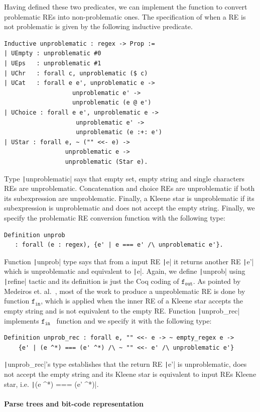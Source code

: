 \documentclass[oneside,12pt]{scrbook}
\theoremstyle{definition}
\newcommand{\fin}{\ensuremath{\texttt{f$_{\texttt{in}}$}}}
\newcommand{\fout}{\ensuremath{\texttt{f$_{\texttt{out}}$}}}
\newcommand{\coq}[1]{\texttt|#1|}
\theoremstyle{plain}
\theoremstyle{definition}
\begin{document}
Having defined these two predicates, we can implement the function to
convert problematic REs into non-problematic ones. The specification
of when a RE is not problematic is given by the following inductive predicate. 
\begin{verbatim}
Inductive unproblematic : regex -> Prop :=
| UEmpty : unproblematic #0
| UEps   : unproblematic #1
| UChr   : forall c, unproblematic ($ c)
| UCat   : forall e e', unproblematic e ->
                   unproblematic e' ->
                   unproblematic (e @ e')
| UChoice : forall e e', unproblematic e ->
                    unproblematic e' ->
                    unproblematic (e :+: e')
| UStar : forall e, ~ ("" <<- e) -> 
                 unproblematic e -> 
                 unproblematic (Star e).
\end{verbatim}
Type \coq{unproblematic} says that empty set, empty string and single
characters REs are unproblematic. Concatenation and choice REs are
unproblematic if both its subexpression are unproblematic. Finally,
a Kleene star is unproblematic if its subexpression is unproblematic and
does not accept the empty string. Finally, we specify the problematic RE
conversion function with the following type:
\begin{verbatim}
Definition unprob 
   : forall (e : regex), {e' | e === e' /\ unproblematic e'}.
\end{verbatim}
Function \coq{unprob} type says that from a input RE \coq{e} it returns another
RE \coq{e'} which is unproblematic and equivalent to \coq{e}. Again, we define
\coq{unprob} using \coq{refine} tactic and its definition is just the
Coq coding of \fout. As pointed by Medeiros et. al.~\cite{Medeiros14}, most of
the work to produce a unproblematic RE is done by function \fin, which is
applied when the inner RE of a Kleene star accepts the empty string and is not
equivalent to the empty RE. Function \coq{unprob_rec} implements \fin~ function
and we specify it with the following type:
\begin{verbatim}
Definition unprob_rec : forall e, "" <<- e -> ~ empty_regex e -> 
    {e' | (e ^*) === (e' ^*) /\ ~ "" <<- e' /\ unproblematic e'}
\end{verbatim}
\coq{unprob_rec}'s type establishes that the return RE \coq{e'} is unproblematic, does not
accept the empty string and its Kleene star is equivalent to input REs
Kleene star, i.e.  \coq{(e ^*) === (e' ^*)}.

\paragraph{Parse trees and bit-code representation}
\end{document}
